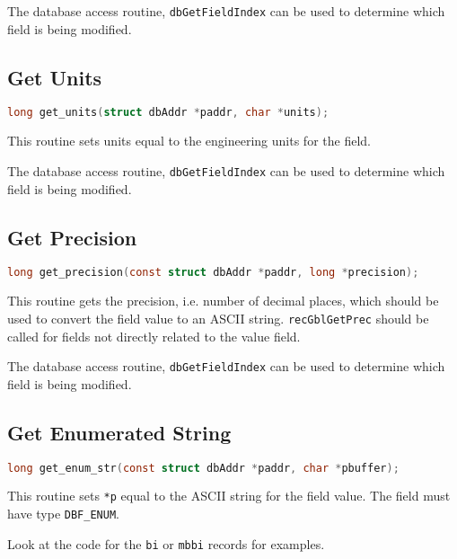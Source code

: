 The database access routine, \verb|dbGetFieldIndex| can be used to determine which field is being modified.

\subsection{Get Units}

\begin{lstlisting}[language=C]
long get_units(struct dbAddr *paddr, char *units);
\end{lstlisting}

This routine sets units equal to the engineering units for the field.

The database access routine, \verb|dbGetFieldIndex| can be used to determine which field is being modified.

\subsection{Get Precision}

\begin{lstlisting}[language=C]
long get_precision(const struct dbAddr *paddr, long *precision);
\end{lstlisting}

This routine gets the precision, i.e.
number of decimal places, which should be used to convert the field value to an ASCII string.
\verb|recGblGetPrec| should be called for fields not directly related to the value field.

The database access routine, \verb|dbGetFieldIndex| can be used to determine which field is being modified.

\subsection{Get Enumerated String}

\begin{lstlisting}[language=C]
long get_enum_str(const struct dbAddr *paddr, char *pbuffer);
\end{lstlisting}

This routine sets \verb|*p| equal to the ASCII string for the field value.
The field must have type \verb|DBF_ENUM|.

Look at the code for the \verb|bi| or \verb|mbbi| records for examples.

